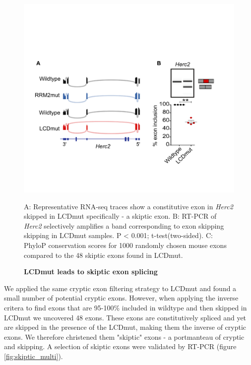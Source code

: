 \begin{figure}[h!]
	\begin{center}
		\includegraphics[width=14cm]{Figures/05_tdp_mice/skiptic_exon_multi.png}
	\end{center}
	\caption{\textbf{LCDmut leads to skiptic exon splicing}}
	A: Representative RNA-seq traces show a constitutive exon in \textit{Herc2} skipped in LCDmut specifically - a skiptic exon. B: RT-PCR of \textit{Herc2} selectively amplifies a band corresponding to exon skipping skipping in LCDmut samples. P < 0.001; t-test(two-sided). C: PhyloP conservation scores for 1000 randomly chosen mouse exons compared to the 48 skiptic exons found in LCDmut.
	\label{skiptic_multi}
\end{figure}

We applied the same cryptic exon filtering strategy to LCDmut and found a small number of potential cryptic exons. However, when applying the inverse critera to find exons that are 95-100\% included in wildtype and then skipped in LCDmut we uncovered 48 exons. These exons are constitutively spliced and yet are skipped in the presence of the LCDmut, making them the inverse of cryptic exons. We therefore christened them "skiptic" exons - a portmanteau of cryptic and skipping. A selection of skiptic exons were validated by RT-PCR (figure \ref{fig:skiptic_multi}). 


